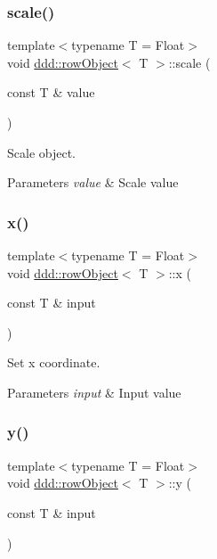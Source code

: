 \subsubsection{\texorpdfstring{scale()}{scale()}}
{\footnotesize\ttfamily template$<$typename T  = Float$>$ \\
void \hyperlink{classddd_1_1row_object}{ddd\+::row\+Object}$<$ T $>$\+::scale (\begin{DoxyParamCaption}\item[{const T \&}]{value }\end{DoxyParamCaption})\hspace{0.3cm}{\ttfamily [inline]}}



Scale object. 


\begin{DoxyParams}{Parameters}
{\em value} & Scale value \\
\hline
\end{DoxyParams}
\mbox{\label{classddd_1_1row_object_afe92fca2bf490cdef9b684bd3847d7eb}} 
\subsubsection{\texorpdfstring{x()}{x()}}
{\footnotesize\ttfamily template$<$typename T  = Float$>$ \\
void \hyperlink{classddd_1_1row_object}{ddd\+::row\+Object}$<$ T $>$\+::x (\begin{DoxyParamCaption}\item[{const T \&}]{input }\end{DoxyParamCaption})\hspace{0.3cm}{\ttfamily [inline]}}



Set x coordinate. 


\begin{DoxyParams}{Parameters}
{\em input} & Input value \\
\hline
\end{DoxyParams}
\mbox{\label{classddd_1_1row_object_aeb7d81b5fcffd7d8a17fea5b85c37b43}} 
\subsubsection{\texorpdfstring{y()}{y()}}
{\footnotesize\ttfamily template$<$typename T  = Float$>$ \\
void \hyperlink{classddd_1_1row_object}{ddd\+::row\+Object}$<$ T $>$\+::y (\begin{DoxyParamCaption}\item[{const T \&}]{input }\end{DoxyParamCaption})\hspace{0.3cm}{\ttfamily [inline]}}



